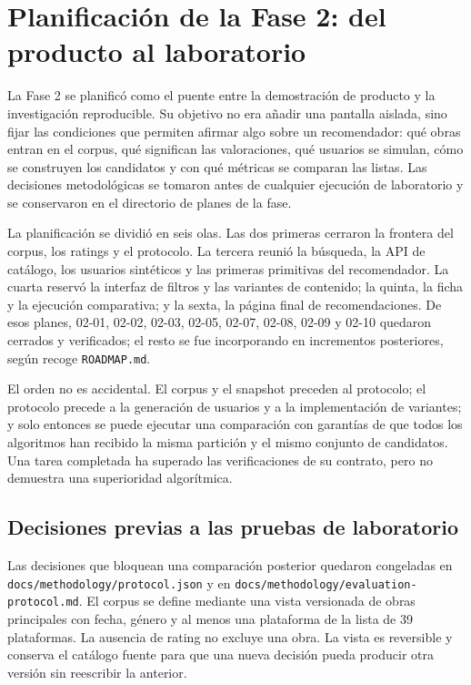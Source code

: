 \section{Planificación de la Fase 2: del producto al laboratorio}\label{sec:met-fase2}

La Fase 2 se planificó como el puente entre la demostración de producto y la investigación
reproducible. Su objetivo no era añadir una pantalla aislada, sino fijar las condiciones que
permiten afirmar algo sobre un recomendador: qué obras entran en el corpus, qué significan
las valoraciones, qué usuarios se simulan, cómo se construyen los candidatos y con qué
métricas se comparan las listas. Las decisiones metodológicas se tomaron antes de cualquier
ejecución de laboratorio y se conservaron en el directorio de planes de la fase.

La planificación se dividió en seis olas. Las dos primeras cerraron la frontera del corpus,
los ratings y el protocolo. La tercera reunió la búsqueda, la API de catálogo, los usuarios
sintéticos y las primeras primitivas del recomendador. La cuarta reservó la interfaz de
filtros y las variantes de contenido; la quinta, la ficha y la ejecución comparativa; y la
sexta, la página final de recomendaciones. De esos planes, 02-01, 02-02, 02-03, 02-05, 02-07, 02-08, 02-09 y 02-10 quedaron cerrados y
verificados; el resto se fue incorporando en incrementos posteriores, según recoge
\texttt{ROADMAP.md}.

El orden no es accidental. El corpus y el snapshot preceden al protocolo; el protocolo
precede a la generación de usuarios y a la implementación de variantes; y solo entonces se
puede ejecutar una comparación con garantías de que todos los algoritmos han recibido la
misma partición y el mismo conjunto de candidatos. Una tarea completada ha superado las
verificaciones de su contrato, pero no demuestra una superioridad algorítmica.

\subsection{Decisiones previas a las pruebas de laboratorio}

Las decisiones que bloquean una comparación posterior quedaron congeladas en
\texttt{docs/methodology/protocol.json} y en
\texttt{docs/methodology/evaluation-protocol.md}. El corpus se define mediante una vista
versionada de obras principales con fecha, género y al menos una plataforma de la lista de
39 plataformas. La ausencia de rating no excluye una obra. La vista es reversible y conserva
el catálogo fuente para que una nueva decisión pueda producir otra versión sin reescribir la
anterior.

